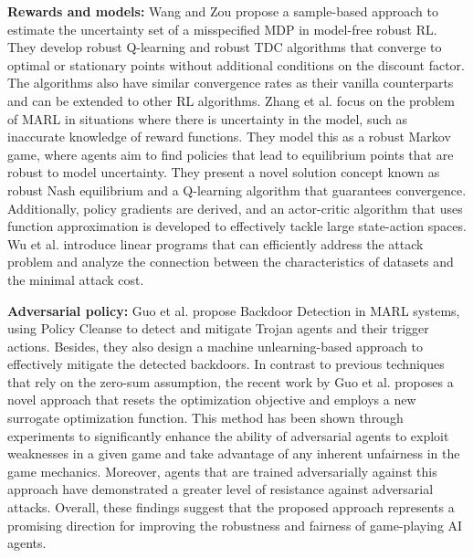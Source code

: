 \documentclass[acmsmall]{acmart}
\begin{document}
\textbf{Rewards and models:} Wang and Zou \cite{NEURIPS2021_3a449677} propose a sample-based approach to estimate the uncertainty set of a misspecified MDP in model-free robust RL. They develop robust Q-learning and robust TDC algorithms that converge to optimal or stationary points without additional conditions on the discount factor. The algorithms also have similar convergence rates as their vanilla counterparts and can be extended to other RL algorithms.
Zhang et al. \cite{NEURIPS2020_77441296} focus on the problem of MARL in situations where there is uncertainty in the model, such as inaccurate knowledge of reward functions. They model this as a robust Markov game, where agents aim to find policies that lead to equilibrium points that are robust to model uncertainty. 
They present a novel solution concept known as robust Nash equilibrium and a Q-learning algorithm that guarantees convergence. Additionally, policy gradients are derived, and an actor-critic algorithm that uses function approximation is developed to effectively tackle large state-action spaces.
Wu et al. \cite{wu2022reward} introduce linear programs that can efficiently address the attack problem and analyze the connection between the characteristics of datasets and the minimal attack cost.

\textbf{Adversarial policy:} Guo et al. \cite{guo2022backdoor} propose Backdoor Detection in MARL systems, using Policy Cleanse to detect and mitigate Trojan agents and their trigger actions. Besides, they also design a machine unlearning-based approach to effectively mitigate the detected backdoors.
In contrast to previous techniques that rely on the zero-sum assumption, the recent work by Guo et al. \cite{pmlr-v139-guo21b} proposes a novel approach that resets the optimization objective and employs a new surrogate optimization function. This method has been shown through experiments to significantly enhance the ability of adversarial agents to exploit weaknesses in a given game and take advantage of any inherent unfairness in the game mechanics. Moreover, agents that are trained adversarially against this approach have demonstrated a greater level of resistance against adversarial attacks. Overall, these findings suggest that the proposed approach represents a promising direction for improving the robustness and fairness of game-playing AI agents.
\end{document}

